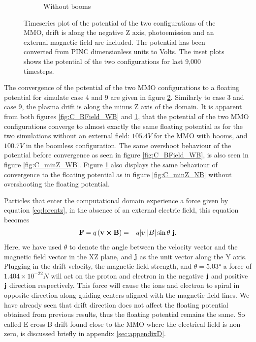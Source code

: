 \begin{figure}[H]
\begin{subfigure}[b]{0.75\textwidth}
  \caption{Without booms}
  \label{fig:C_BField_NB}
\end{subfigure}
\caption{Timeseries plot of the potential of the two configurations of the MMO, drift is along the negative Z axis, photoemission and an external magnetic field are included. The potential has been converted from PINC dimensionless units to Volts. The inset plots shows the potential of the two configurations for last 9,000 timesteps.}
\label{fig:Conv_BField}
\end{figure}

The convergence of the potential of the two MMO configurations to a floating potential for simulate case 4 and 9 are given in figure \ref{fig:Conv_BField}. Similarly to case 3 and case 9, the plasma drift is along the minus Z axis of the domain. It is apparent from both figures \ref{fig:C_BField_WB} and \ref{fig:C_BField_NB}, that the potential of the two MMO configurations converge to almost exactly the same floating potential as for the two simulations without an external field: $105.4 V$ for the MMO with booms, and $100.7 V$ in the boomless configuration. The same overshoot behaviour of the potential before convergence as seen in figure \ref{fig:C_BField_WB}, is also seen in figure \ref{fig:C_minZ_WB}. Figure \ref{fig:C_BField_NB} also displays the same behaviour of convergence to the floating potential as in figure \ref{fig:C_minZ_NB} without overshooting the floating potential.

Particles that enter the computational domain experience a force given by equation \eqref{eq:lorentz}, in the absence of an external electric field, this equation becomes
\begin{equation}
    \vb{F} = q\left(\vb{v} \cross \vb{B}\right) = - q \abs{v} \abs{B} \sin{\theta} \; \vb{j}.
\end{equation}
Here, we have used $\theta$ to denote the angle between the velocity vector and the magnetic field vector in the XZ plane, and $\vb{j}$ as the unit vector along the Y axis. Plugging in the drift velocity, the magnetic field strength, and $\theta = \ang{5.03}$  
a force of $1.404 \times 10^{-22} N$ will act on the proton and electron in the negative $\vb{j}$ and positive $\vb{j}$ direction respectively. This force will cause the ions and electron to spiral in opposite direction along guiding centers aligned with the magnetic field lines. We have already seen that drift direction does not affect the floating potential obtained from previous results, thus the floating potential remains the same. So called E cross B drift found close to the MMO where the electrical field is non-zero, is discussed briefly in appendix \ref{sec:appendixD}. 

